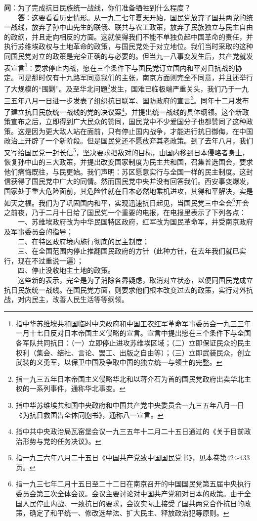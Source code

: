 \documentclass[cn,11pt,chinese]{elegantbook}
\begin{document}
\textbf{问}：为了完成抗日民族统一战线，你们准备牺牲到什么程度？\\
　　\textbf{答}：这要看看历史情形。从一九二七年夏天开始，国民党放弃了国共两党的统一战线，放弃了孙中山先生的联俄、联共与农工政策，放弃了民族独立与民主自由的政纲，并且走向相反的方面。这就使得我们不能不单独负起中国革命的责任，并执行苏维埃政权与土地革命的政策，与国民党处于对立地位。我们当时采取的这种同国民党对立的政策是完全正确的与必要的。但当九一八事变发生后，共产党就发表宣言\footnote[2]{指中华苏维埃共和国临时中央政府和中国工农红军革命军事委员会一九三三年一月十七日反对日本帝国主义侵略的宣言。宣言中提出愿在三个条件下与全国各军队共同抗日：（一）立即停止进攻苏维埃区域；（二）立即保证民众的民主权利（集会、结社、言论、罢工、出版之自由等）；（三）立即武装民众，创立武装的义勇军，以保卫中国及争取中国的独立统一与领土的完整。}：要求停止内战，愿在三个条件下与国民党订立国内和平对日抗战的协定。可是那时仅有十九路军同意我们的主张，南京方面则完全不同意，并且还举行了大规模的“围剿”。及至华北问题\footnote[3]{指一九三五年日本帝国主义侵略华北和以蒋介石为首的国民党政府出卖华北主权的一系列事件，通称华北事变。}发生，国难已临极端严重关头，我们乃于一九三五年八月一日进一步发表了组织抗日联军、国防政府的宣言\footnote[4]{指中华苏维埃共和国中央政府和中国共产党中央委员会一九三五年八月一日《为抗日救国告全体同胞书》，通称八一宣言。}。同年十二月发布了建立抗日民族统一战线的党的决议案\footnote[5]{指中共中央政治局瓦窑堡会议一九三五年十二月二十五日通过的《关于目前政治形势与党的任务决议》。}，并提出统一战线的具体纲领。这个新政策宣布之后，立即得到广大民众的赞同，国民党中不少爱国分子也都赞同了这种政策。这是因为更大敌人站在面前，只有停止国内战争，才能进行抗日御侮，在中国政治上开辟了一个新阶段。但是国民党还不愿放弃其老政策。到了去年八月，我们又写给国民党一封长信\footnote[6]{指一九三六年八月二十五日《中国共产党致中国国民党书》，见本卷第424-433页。}，坚决要求把敌对的目标，由国内移到日本侵略者身上，恢复孙中山的三大政策，并提出改变国家制度为民主共和国，召集普选国会，要求他们痛悔既往，与民更始。我们声明：苏区愿意实行与全国一样的民主制度。这封信获得了国民党中广大的同情。然而国民党中央并没有回答我们。西安事变爆发，国家处于重大危险面前，其危险性就在日本必然地乘机进攻，其得和平解决，实是如天之福。我们为了巩固国内和平，实现迅速抗日起见，当国民党三中全会\footnote[7]{指一九三七年二月十五日至二十二日在南京召开的中国国民党第五届中央执行委员会第三次全体会议。会议主要讨论对中国共产党和对日本的政策。由于全国人民停止内战、一致抗日的要求，会议实际上接受了国共两党合作抗日的政策，确定了和平统一、修改选举法、扩大民主、释放政治犯等原则。}开会之前夜，乃于二月十日给了国民党一个重要的电报，在电报里表示了下列各点：\\
　　一、苏维埃政府改为中华民国特区政府，红军改为国民革命军，并受南京政府及军事委员会的指导；\\
　　二、在特区政府境内施行彻底的民主制度；\\
　　三、在全国范围内停止推翻国民政府的方针（此种方针，在去年我们就已实行，现在不过重说一遍）；\\
　　四、停止没收地主土地的政策。\\
　　这些新的表示，完全是为了消除各界疑虑，取消对立状态，以便同国民党成立抗日民族统一战线。在国民党方面，则要求他们根本改变过去的政策，实行对外抗战，对内民主，改善人民生活等等纲领。\\
\end{document}
